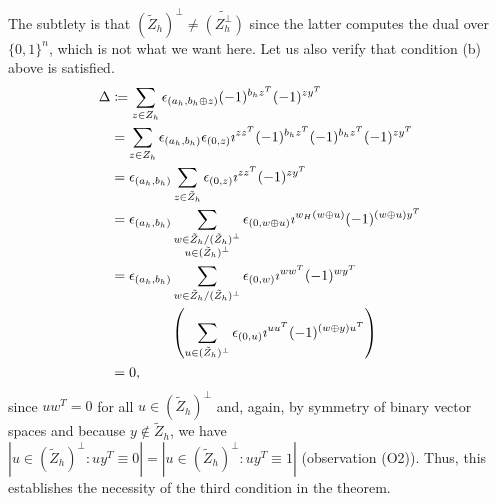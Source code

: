 \documentclass[twoside,romanappendices]{IEEEtran}
\begin{document}
The subtlety is that $(\tilde{Z}_h)^{\perp} \neq \tilde{(Z_h^{\perp})}$ since the latter computes the dual over $\{ 0,1 \}^n$, which is not what we want here.
Let us also verify that condition (b) above is satisfied. %
\begin{align}
\Delta & \coloneqq \sum_{z \in Z_h} \epsilon_{(a_h, b_h \oplus z)} (-1)^{b_h z^T} (-1)^{zy^T} \\
%
  & = \sum_{z \in Z_h} \epsilon_{(a_h, b_h)} \epsilon_{(0,z)} \imath^{zz^T} (-1)^{b_h z^T} (-1)^{b_h z^T} (-1)^{zy^T} \\
  & = \epsilon_{(a_h, b_h)} \sum_{z \in \tilde{Z}_h} \epsilon_{(0,z)} \imath^{zz^T} (-1)^{zy^T} \\
  & = \epsilon_{(a_h, b_h)} \sum_{\substack{w \in \tilde{Z}_h/(\tilde{Z}_h)^{\perp}\\ u \in (\tilde{Z}_h)^{\perp}}} \epsilon_{(0, w \oplus u)} \imath^{w_H(w \oplus u)} (-1)^{(w \oplus u)y^T} \\
  & = \epsilon_{(a_h, b_h)} \sum_{w \in \tilde{Z}_h/(\tilde{Z}_h)^{\perp}} \epsilon_{(0,w)} \imath^{ww^T} (-1)^{wy^T} \nonumber \\
%
  & \hspace*{1.5cm} \left( \sum_{u \in (\tilde{Z}_h)^{\perp}} \epsilon_{(0,u)} \imath^{uu^T} (-1)^{(w \oplus y) u^T} \right) \\
  & = 0,
\end{align}
since $uw^T = 0$ for all $u \in (\tilde{Z}_h)^{\perp}$ and, again, by symmetry of binary vector spaces and because $y \notin \tilde{Z}_h$, we have $|u \in (\tilde{Z}_h)^{\perp} \colon uy^T \equiv 0| = |u \in (\tilde{Z}_h)^{\perp} \colon uy^T \equiv 1|$ (observation (O2)).
Thus, this establishes the necessity of the third condition in the theorem.
\end{document}
